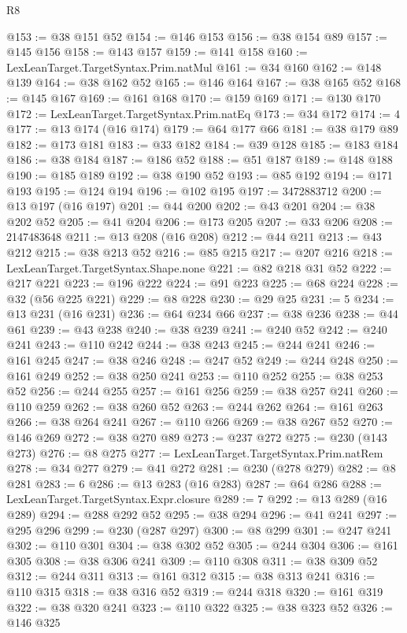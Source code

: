 \begin{lexlean}{R8}
\begin{coremodule}
@153 := @38 @151 @52
@154 := @146 @153
@156 := @38 @154 @89
@157 := @145 @156
@158 := @143 @157
@159 := @141 @158
@160 := LexLeanTarget.TargetSyntax.Prim.natMul
@161 := @34 @160
@162 := @148 @139
@164 := @38 @162 @52
@165 := @146 @164
@167 := @38 @165 @52
@168 := @145 @167
@169 := @161 @168
@170 := @159 @169
@171 := @130 @170
@172 := LexLeanTarget.TargetSyntax.Prim.natEq
@173 := @34 @172
@174 := 4
@177 := @13 @174 (@16 @174)
@179 := @64 @177 @66
@181 := @38 @179 @89
@182 := @173 @181
@183 := @33 @182
@184 := @39 @128
@185 := @183 @184
@186 := @38 @184
@187 := @186 @52
@188 := @51 @187
@189 := @148 @188
@190 := @185 @189
@192 := @38 @190 @52
@193 := @85 @192
@194 := @171 @193
@195 := @124 @194
@196 := @102 @195
@197 := 3472883712
@200 := @13 @197 (@16 @197)
@201 := @44 @200
@202 := @43 @201
@204 := @38 @202 @52
@205 := @41 @204
@206 := @173 @205
@207 := @33 @206
@208 := 2147483648
@211 := @13 @208 (@16 @208)
@212 := @44 @211
@213 := @43 @212
@215 := @38 @213 @52
@216 := @85 @215
@217 := @207 @216
@218 := LexLeanTarget.TargetSyntax.Shape.none
@221 := @82 @218 @31 @52
@222 := @217 @221
@223 := @196 @222
@224 := @91 @223
@225 := @68 @224
@228 := @32 (@56 @225 @221)
@229 := @8 @228
@230 := @29 @25
@231 := 5
@234 := @13 @231 (@16 @231)
@236 := @64 @234 @66
@237 := @38 @236
@238 := @44 @61
@239 := @43 @238
@240 := @38 @239
@241 := @240 @52
@242 := @240 @241
@243 := @110 @242
@244 := @38 @243
@245 := @244 @241
@246 := @161 @245
@247 := @38 @246
@248 := @247 @52
@249 := @244 @248
@250 := @161 @249
@252 := @38 @250 @241
@253 := @110 @252
@255 := @38 @253 @52
@256 := @244 @255
@257 := @161 @256
@259 := @38 @257 @241
@260 := @110 @259
@262 := @38 @260 @52
@263 := @244 @262
@264 := @161 @263
@266 := @38 @264 @241
@267 := @110 @266
@269 := @38 @267 @52
@270 := @146 @269
@272 := @38 @270 @89
@273 := @237 @272
@275 := @230 (@143 @273)
@276 := @8 @275
@277 := LexLeanTarget.TargetSyntax.Prim.natRem
@278 := @34 @277
@279 := @41 @272
@281 := @230 (@278 @279)
@282 := @8 @281
@283 := 6
@286 := @13 @283 (@16 @283)
@287 := @64 @286
@288 := LexLeanTarget.TargetSyntax.Expr.closure
@289 := 7
@292 := @13 @289 (@16 @289)
@294 := @288 @292 @52
@295 := @38 @294
@296 := @41 @241
@297 := @295 @296
@299 := @230 (@287 @297)
@300 := @8 @299
@301 := @247 @241
@302 := @110 @301
@304 := @38 @302 @52
@305 := @244 @304
@306 := @161 @305
@308 := @38 @306 @241
@309 := @110 @308
@311 := @38 @309 @52
@312 := @244 @311
@313 := @161 @312
@315 := @38 @313 @241
@316 := @110 @315
@318 := @38 @316 @52
@319 := @244 @318
@320 := @161 @319
@322 := @38 @320 @241
@323 := @110 @322
@325 := @38 @323 @52
@326 := @146 @325

\end{coremodule}
\end{lexlean}
